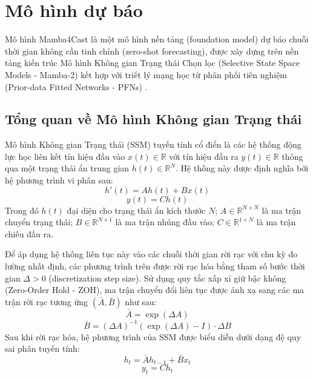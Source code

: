 \section{Mô hình dự báo}
\label{sec:mamba4cast_model}

Mô hình Mamba4Cast \cite{bhethanabhotla2024} là một mô hình nền tảng (foundation model) dự báo chuỗi thời gian không cần tinh chỉnh (zero-shot forecasting), được xây dựng trên nền tảng kiến trúc Mô hình Không gian Trạng thái Chọn lọc (Selective State Space Models - Mamba-2) \cite{dao2024} kết hợp với triết lý mạng học từ phân phối tiên nghiệm (Prior-data Fitted Networks - PFNs) \cite{hollmann2023}. 

\subsection{Tổng quan về Mô hình Không gian Trạng thái}
\label{subsec:ssm_background}

Mô hình Không gian Trạng thái (SSM) tuyến tính cổ điển \cite{gu2024mamba} là các hệ thống động lực học liên kết tín hiệu đầu vào $x(t) \in \mathbb{R}$ với tín hiệu đầu ra $y(t) \in \mathbb{R}$ thông qua một trạng thái ẩn trung gian $h(t) \in \mathbb{R}^N$. Hệ thống này được định nghĩa bởi hệ phương trình vi phân sau:
\begin{equation}
    h'(t) = A h(t) + B x(t)
\end{equation}
\begin{equation}
    y(t) = C h(t)
\end{equation}
Trong đó $h(t)$ đại diện cho trạng thái ẩn kích thước $N$; $A \in \mathbb{R}^{N \times N}$ là ma trận chuyển trạng thái; $B \in \mathbb{R}^{N \times 1}$ là ma trận nhúng đầu vào; $C \in \mathbb{R}^{1 \times N}$ là ma trận chiếu đầu ra.

Để áp dụng hệ thống liên tục này vào các chuỗi thời gian rời rạc với chu kỳ đo lường nhất định, các phương trình trên được rời rạc hóa bằng tham số bước thời gian $\Delta > 0$ (discretization step size). Sử dụng quy tắc xấp xỉ giữ bậc không (Zero-Order Hold - ZOH), ma trận chuyển đổi liên tục được ánh xạ sang các ma trận rời rạc tương ứng $(\bar{A}, \bar{B})$ như sau:
\begin{equation}
    \bar{A} = \exp(\Delta A)
\end{equation}
\begin{equation}
    \bar{B} = (\Delta A)^{-1}(\exp(\Delta A) - I) \cdot \Delta B
\end{equation}
Sau khi rời rạc hóa, hệ phương trình của SSM được biểu diễn dưới dạng đệ quy sai phân tuyến tính:
\begin{equation}
    h_t = \bar{A} h_{t-1} + \bar{B} x_t
\end{equation}
\begin{equation}
    y_t = C h_t
\end{equation}

